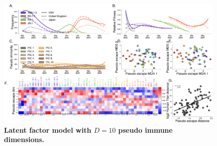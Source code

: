 \documentclass[11pt,oneside,letterpaper]{article}
\begin{document}
\begin{figure}[t!]
    \centering
    \includegraphics[width=1.0\textwidth=0.01]{./supplementary_figures/latent_immune_10_dims.png}
    \caption{
      \textbf{Latent factor model with $D=10$ pseudo immune dimensions.}
    }
    \label{fig:latent_factor_10}
\end{figure}
\end{document}
